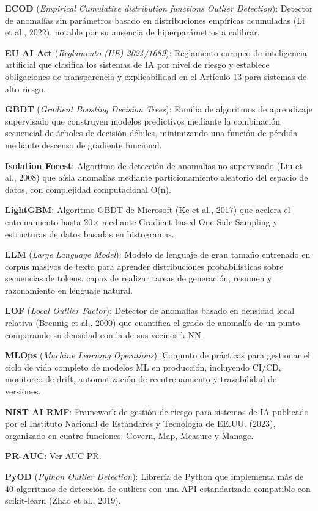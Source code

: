 \textbf{ECOD} (\emph{Empirical Cumulative distribution functions Outlier
Detection}): Detector de anomalías sin parámetros basado en
distribuciones empíricas acumuladas (Li et al., 2022), notable por su
ausencia de hiperparámetros a calibrar.

\textbf{EU AI Act} (\emph{Reglamento (UE) 2024/1689}): Reglamento
europeo de inteligencia artificial que clasifica los sistemas de IA por
nivel de riesgo y establece obligaciones de transparencia y
explicabilidad en el Artículo 13 para sistemas de alto riesgo.

\textbf{GBDT} (\emph{Gradient Boosting Decision Trees}): Familia de
algoritmos de aprendizaje supervisado que construyen modelos predictivos
mediante la combinación secuencial de árboles de decisión débiles,
minimizando una función de pérdida mediante descenso de gradiente
funcional.

\textbf{Isolation Forest}: Algoritmo de detección de anomalías no
supervisado (Liu et al., 2008) que aísla anomalías mediante
particionamiento aleatorio del espacio de datos, con complejidad
computacional O(n).

\textbf{LightGBM}: Algoritmo GBDT de Microsoft (Ke et al., 2017) que
acelera el entrenamiento hasta 20× mediante Gradient-based One-Side
Sampling y estructuras de datos basadas en histogramas.

\textbf{LLM} (\emph{Large Language Model}): Modelo de lenguaje de gran
tamaño entrenado en corpus masivos de texto para aprender distribuciones
probabilísticas sobre secuencias de tokens, capaz de realizar tareas de
generación, resumen y razonamiento en lenguaje natural.

\textbf{LOF} (\emph{Local Outlier Factor}): Detector de anomalías basado
en densidad local relativa (Breunig et al., 2000) que cuantifica el
grado de anomalía de un punto comparando su densidad con la de sus
vecinos k-NN.

\textbf{MLOps} (\emph{Machine Learning Operations}): Conjunto de
prácticas para gestionar el ciclo de vida completo de modelos ML en
producción, incluyendo CI/CD, monitoreo de drift, automatización de
reentrenamiento y trazabilidad de versiones.

\textbf{NIST AI RMF}: Framework de gestión de riesgo para sistemas de IA
publicado por el Instituto Nacional de Estándares y Tecnología de EE.UU.
(2023), organizado en cuatro funciones: Govern, Map, Measure y Manage.

\textbf{PR-AUC}: Ver AUC-PR.

\textbf{PyOD} (\emph{Python Outlier Detection}): Librería de Python que
implementa más de 40 algoritmos de detección de outliers con una API
estandarizada compatible con scikit-learn (Zhao et al., 2019).

